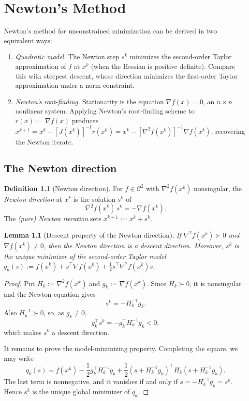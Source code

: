 \documentclass[11pt,a4paper]{report}
\theoremstyle{plain}
\newtheorem{lemma}[theorem]{Lemma}
\theoremstyle{definition}
\newtheorem{definition}[theorem]{Definition}
\newcommand{\grad}{\nabla}
\newcommand{\hess}{\nabla^{2}}
\newcommand{\trans}{^{\top}}
\begin{document}
\chapter{Newton's Method}
\label{ch:newton}

Newton's method for unconstrained minimization can be derived in two equivalent
ways:
\begin{enumerate}[leftmargin=2em,itemsep=0pt]
  \item \emph{Quadratic model.} The Newton step $s^{k}$ minimizes the second-order
        Taylor approximation of $f$ at $x^{k}$ (when the Hessian is positive
        definite). Compare this with steepest descent, whose direction minimizes
        the first-order Taylor approximation under a norm constraint.
  \item \emph{Newton's root-finding.} Stationarity is the equation $\grad f(x)=0$,
        an $n\times n$ nonlinear system. Applying Newton's root-finding scheme to
        $r(x):=\grad f(x)$ produces
        $x^{k+1}=x^{k}-[J(x^{k})]^{-1}r(x^{k})=x^{k}-[\hess f(x^{k})]^{-1}\grad f(x^{k})$,
        recovering the Newton iterate.
\end{enumerate}

\section{The Newton direction}

\begin{definition}[Newton direction]
For $f\in\mathcal{C}^{2}$ with $\hess f(x^{k})$ nonsingular, the
\emph{Newton direction} at $x^{k}$ is the solution $s^{k}$ of
\begin{equation}\label{eq:newton-system}
\hess f(x^{k})\,s^{k}=-\grad f(x^{k}).
\end{equation}
The \emph{(pure) Newton iteration} sets $x^{k+1}:=x^{k}+s^{k}$.
\end{definition}

\begin{lemma}[Descent property of the Newton direction]\label{lem:newton-descent}
If $\hess f(x^{k})\succ 0$ and $\grad f(x^{k})\ne0$, then the Newton direction is
a descent direction. Moreover, $s^{k}$ is the unique minimizer of the
second-order Taylor model
$q_{k}(s):=f(x^{k})+s\trans\grad f(x^{k})+\tfrac12 s\trans\hess f(x^{k})s$.
\end{lemma}
\begin{proof}
  Put $H_{k}:=\hess f(x^{k})$ and $g_{k}:=\grad f(x^{k})$. Since
  $H_{k}\succ 0$, it is nonsingular and the Newton equation gives
  \[
    s^{k} = -H_{k}^{-1}g_{k}.
  \]
  Also $H_{k}^{-1}\succ 0$, so, as $g_{k}\ne0$,
  \[
    g_{k}\trans s^{k} = -g_{k}\trans H_{k}^{-1}g_{k}<0,
  \]
  which makes $s^{k}$ a descent direction.

  It remains to prove the model-minimizing property. Completing the square, we may write
  \[
    q_{k}(s) = f(x^{k})-\frac12 g_{k}\trans H_{k}^{-1}g_{k} + \frac12 (s+H_{k}^{-1}g_{k})\trans H_{k}(s+H_{k}^{-1}g_{k}).
  \]
  The last term is nonnegative, and it vanishes if and only if
  $s=-H_{k}^{-1}g_{k}=s^{k}$. Hence $s^{k}$ is the unique global minimizer of
  $q_{k}$.
\end{proof}
\end{document}
